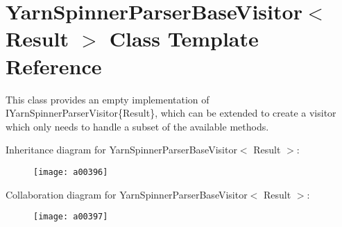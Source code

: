 \hypertarget{a00187}{\section{Yarn\-Spinner\-Parser\-Base\-Visitor$<$ Result $>$ Class Template Reference}
\label{a00187}
}


This class provides an empty implementation of I\-Yarn\-Spinner\-Parser\-Visitor\{\-Result\}, which can be extended to create a visitor which only needs to handle a subset of the available methods.  




Inheritance diagram for Yarn\-Spinner\-Parser\-Base\-Visitor$<$ Result $>$\-:
\nopagebreak
\begin{figure}[H]
\begin{center}
\leavevmode
\texttt{[image: a00396]}
\end{center}
\end{figure}


Collaboration diagram for Yarn\-Spinner\-Parser\-Base\-Visitor$<$ Result $>$\-:
\nopagebreak
\begin{figure}[H]
\begin{center}
\leavevmode
\texttt{[image: a00397]}
\end{center}
\end{figure}
